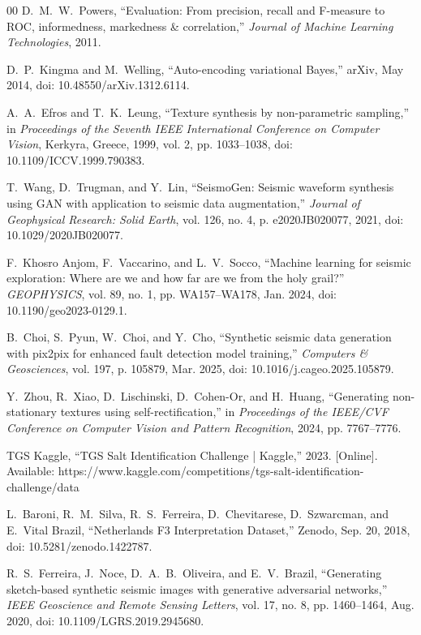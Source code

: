 \documentclass{ieeeaccess}
\begin{document}
\begin{thebibliography}{00}
D.~M.~W.~Powers, ``Evaluation: From precision, recall and F-measure to ROC, informedness, markedness \& correlation,'' \emph{Journal of Machine Learning Technologies}, 2011.

D.~P.~Kingma and M.~Welling, ``Auto-encoding variational Bayes,'' arXiv, May 2014, doi: 10.48550/arXiv.1312.6114.

A.~A.~Efros and T.~K.~Leung, ``Texture synthesis by non-parametric sampling,'' in \emph{Proceedings of the Seventh IEEE International Conference on Computer Vision}, Kerkyra, Greece, 1999, vol. 2, pp. 1033--1038, doi: 10.1109/ICCV.1999.790383.

T.~Wang, D.~Trugman, and Y.~Lin, ``SeismoGen: Seismic waveform synthesis using GAN with application to seismic data augmentation,'' \emph{Journal of Geophysical Research: Solid Earth}, vol. 126, no. 4, p. e2020JB020077, 2021, doi: 10.1029/2020JB020077.

F.~Khosro Anjom, F.~Vaccarino, and L.~V.~Socco, ``Machine learning for seismic exploration: Where are we and how far are we from the holy grail?'' \emph{GEOPHYSICS}, vol. 89, no. 1, pp. WA157--WA178, Jan. 2024, doi: 10.1190/geo2023-0129.1.

B.~Choi, S.~Pyun, W.~Choi, and Y.~Cho, ``Synthetic seismic data generation with pix2pix for enhanced fault detection model training,'' \emph{Computers \& Geosciences}, vol. 197, p. 105879, Mar. 2025, doi: 10.1016/j.cageo.2025.105879.

Y.~Zhou, R.~Xiao, D.~Lischinski, D.~Cohen-Or, and H.~Huang, ``Generating non-stationary textures using self-rectification,'' in \emph{Proceedings of the IEEE/CVF Conference on Computer Vision and Pattern Recognition}, 2024, pp. 7767--7776.

TGS Kaggle, ``TGS Salt Identification Challenge | Kaggle,'' 2023. [Online]. Available: https://www.kaggle.com/competitions/tgs-salt-identification-challenge/data

L.~Baroni, R.~M.~Silva, R.~S.~Ferreira, D.~Chevitarese, D.~Szwarcman, and E.~Vital Brazil, ``Netherlands F3 Interpretation Dataset,'' Zenodo, Sep. 20, 2018, doi: 10.5281/zenodo.1422787.

R.~S.~Ferreira, J.~Noce, D.~A.~B.~Oliveira, and E.~V.~Brazil, ``Generating sketch-based synthetic seismic images with generative adversarial networks,'' \emph{IEEE Geoscience and Remote Sensing Letters}, vol. 17, no. 8, pp. 1460--1464, Aug. 2020, doi: 10.1109/LGRS.2019.2945680.


\end{thebibliography}
\end{document}
